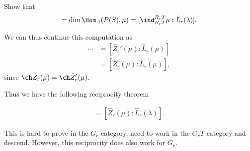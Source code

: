 \begin{exercise}[?]

Show that
\begin{align*}  
[M: S] = \dim \Hom_A( P(S), \mu) = [\ind_{B_r T}^{B_r T} \mu : \hat{L}_r(\lambda)]
.\end{align*}

\end{exercise}

We can thus continue this computation as
\begin{align*}  
\cdots 
&= [\hat{Z}_r'(\mu) : \hat{L}_r(\mu)] \\
&= [\hat{Z}_r(\mu) : \hat{L}_r(\mu)]
,\end{align*} since \(\ch \hat{Z}_r (\mu) = \ch \hat{Z}_r'(\mu)\).

Thus we have the following reciprocity theorem

\begin{theorem}[Humphreys]

\begin{align*}  
[\hat{Q}_r(\lambda): \hat{Z}_r(\mu)] = [\hat{Z}_r(\mu) : \hat{L}_r (\lambda) ]
.\end{align*}

\end{theorem}

\begin{remark}

This is hard to prove in the \(G_r\) category, need to work in the
\(G_r T\) category and descend. However, this reciprocity does also work
for \(G_r\).

\end{remark}

